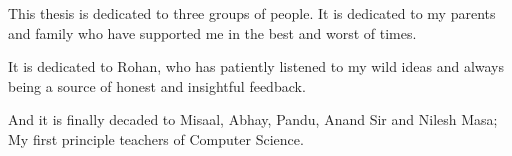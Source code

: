 \leavevmode\vfill
This thesis is dedicated to three groups of people. It is dedicated to my parents and family who have supported me in the best and worst of times. 

It is dedicated to Rohan, who has patiently listened to my wild ideas and always being a source of honest and insightful feedback. 

And it is finally decaded to Misaal, Abhay, Pandu, Anand Sir and Nilesh Masa; My first principle teachers of Computer Science. 
\vfill